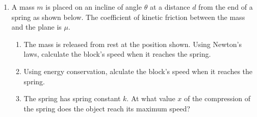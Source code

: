 \documentclass{../../../oss-apphys}
\begin{document}
\begin{enumerate}[leftmargin=15pt]

\item A mass $m$ is placed on an incline of angle $\theta$ at a distance $d$
  from the end of a spring as shown below. The coefficient of kinetic friction
  between the mass and the plane is $\mu$.
  \begin{center}
  \end{center}
  \begin{enumerate}[leftmargin=18pt]
  \item The mass is released from rest at the position shown. Using Newton's
    laws, calculate the block's speed when it reaches the spring.
    \vspace{1.25in}
  \item Using energy conservation, alculate the block's speed when it reaches
    the spring.
    \vspace{1.25in}
  \item The spring has spring constant $k$. At what value $x$ of the compression
    of the spring does the object reach its maximum speed?
  \end{enumerate}
  \newpage
  

\end{enumerate}
\end{document}
